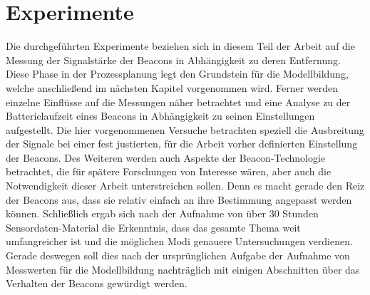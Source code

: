 \chapter{Experimente}
Die durchgeführten Experimente beziehen sich in diesem Teil der Arbeit auf die Messung der Signalstärke der Beacons in Abhängigkeit zu deren Entfernung. Diese Phase in der Prozessplanung legt den Grundstein für die Modellbildung, welche anschließend im nächsten Kapitel vorgenommen wird. Ferner werden einzelne Einflüsse auf die Messungen näher betrachtet und eine Analyse zu der Batterielaufzeit eines Beacons in Abhängigkeit zu seinen Einstellungen aufgestellt. Die hier vorgenommenen Versuche betrachten speziell die Ausbreitung der Signale bei einer fest justierten, für die Arbeit vorher definierten Einstellung der Beacons. Des Weiteren werden auch Aspekte der Beacon-Technologie betrachtet, die für spätere Forschungen von Interesse wären, aber auch die Notwendigkeit dieser Arbeit unterstreichen sollen. Denn es macht gerade den Reiz der Beacons aus, dass sie relativ einfach an ihre Bestimmung angepasst werden können. Schließlich ergab sich nach der Aufnahme von über 30 Stunden Sensordaten-Material die Erkenntnis, dass das gesamte Thema weit umfangreicher ist und die möglichen Modi genauere Untersuchungen verdienen. Gerade deswegen soll dies nach der ursprünglichen Aufgabe der Aufnahme von Messwerten für die Modellbildung nachträglich mit einigen Abschnitten über das Verhalten der Beacons gewürdigt werden.
